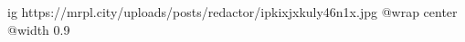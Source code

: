  
 
 
 
 

\ifcmt
  ig https://mrpl.city/uploads/posts/redactor/ipkixjxkuly46n1x.jpg
  @wrap center
  @width 0.9
\fi
